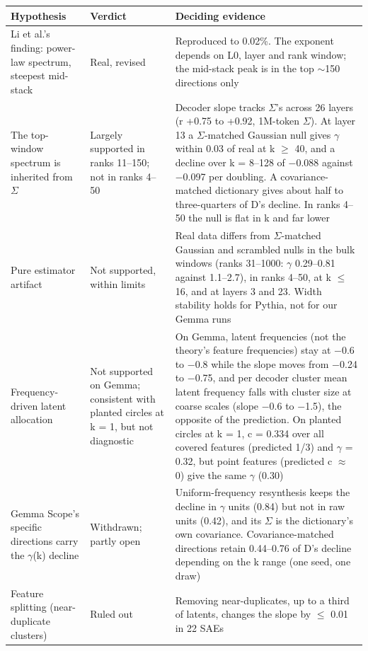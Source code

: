 \documentclass[11pt]{article}
\begin{document}
{\small
\begin{xltabular}{\textwidth}{>{\raggedright\arraybackslash}X>{\raggedright\arraybackslash}X>{\raggedright\arraybackslash}X}
\toprule
\textbf{Hypothesis} & \textbf{Verdict} & \textbf{Deciding evidence} \\
\midrule
\endhead
\bottomrule
\endlastfoot
Li et al.'s finding: power-law spectrum, steepest mid-stack & Real, revised & Reproduced to 0.02\%. The exponent depends on L0, layer and rank window; the mid-stack peak is in the top $\sim$150 directions only \\
The top-window spectrum is inherited from $\Sigma$ & Largely supported in ranks 11--150; not in ranks 4--50 & Decoder slope tracks $\Sigma$'s across 26 layers (r +0.75 to +0.92, 1M-token $\Sigma$). At layer 13 a $\Sigma$-matched Gaussian null gives $\gamma$ within 0.03 of real at k $\ge$ 40, and a decline over k = 8--128 of $-$0.088 against $-$0.097 per doubling. A covariance-matched dictionary gives about half to three-quarters of D's decline. In ranks 4--50 the null is flat in k and far lower \\
Pure estimator artifact & Not supported, within limits & Real data differs from $\Sigma$-matched Gaussian and scrambled nulls in the bulk windows (ranks 31--1000: $\gamma$ 0.29--0.81 against 1.1--2.7), in ranks 4--50, at k $\le$ 16, and at layers 3 and 23. Width stability holds for Pythia, not for our Gemma runs \\
Frequency-driven latent allocation & Not supported on Gemma; consistent with planted circles at k = 1, but not diagnostic & On Gemma, latent frequencies (not the theory's feature frequencies) stay at $-$0.6 to $-$0.8 while the slope moves from $-$0.24 to $-$0.75, and per decoder cluster mean latent frequency falls with cluster size at coarse scales (slope $-$0.6 to $-$1.5), the opposite of the prediction. On planted circles at k = 1, c = 0.334 over all covered features (predicted 1/3) and $\gamma$ = 0.32, but point features (predicted c $\approx$ 0) give the same $\gamma$ (0.30) \\
Gemma Scope's specific directions carry the $\gamma$(k) decline & Withdrawn; partly open & Uniform-frequency resynthesis keeps the decline in $\gamma$ units (0.84) but not in raw units (0.42), and its $\Sigma$ is the dictionary's own covariance. Covariance-matched directions retain 0.44--0.76 of D's decline depending on the k range (one seed, one draw) \\
Feature splitting (near-duplicate clusters) & Ruled out & Removing near-duplicates, up to a third of latents, changes the slope by $\le$ 0.01 in 22 SAEs \\

\end{xltabular}}
\end{document}
